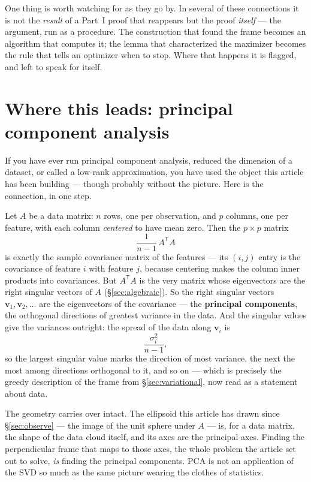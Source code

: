 \documentclass[11pt]{article}
\numberwithin{equation}{section}
\newcommand{\T}{^{\mathsf{T}}}
\newcommand{\vv}[1]{\mathbf{v}_{#1}}
\theoremstyle{plainish}
\begin{document}
One thing is worth watching for as they go by. In several of these connections it
is not the \emph{result} of a Part~I proof that reappears but the proof
\emph{itself} --- the argument, run as a procedure. The construction that found
the frame becomes an algorithm that computes it; the lemma that characterized the
maximizer becomes the rule that tells an optimizer when to stop. Where that
happens it is flagged, and left to speak for itself.

\section{Where this leads: principal component analysis}
\label{sec:pca}

If you have ever run principal component analysis, reduced the dimension of a
dataset, or called a low-rank approximation, you have used the object this
article has been building --- though probably without the picture. Here is the
connection, in one step.

Let $A$ be a data matrix: $n$ rows, one per observation, and $p$ columns, one
per feature, with each column \emph{centered} to have mean zero. Then the
$p \times p$ matrix
\begin{equation}\frac{1}{n-1}\,A\T A
\end{equation}
is exactly the sample covariance matrix of the features --- its $(i,j)$ entry is
the covariance of feature $i$ with feature $j$, because centering makes the
column inner products into covariances. But $A\T A$ is the very matrix whose
eigenvectors are the right singular vectors of $A$ (\S\ref{sec:algebraic}). So
the right singular vectors $\vv1, \vv2, \dots$ are the eigenvectors of the
covariance --- the \textbf{principal components}, the orthogonal directions of
greatest variance in the data. And the singular values give the variances
outright: the spread of the data along $\vv i$ is
\begin{equation}\frac{\sigma_i^2}{n-1},
\end{equation}
so the largest singular value marks the direction of most variance, the next the
most among directions orthogonal to it, and so on --- which is precisely the
greedy description of the frame from \S\ref{sec:variational}, now read as a
statement about data.

The geometry carries over intact. The ellipsoid this article has drawn since
\S\ref{sec:observe} --- the image of the unit sphere under $A$ --- is, for a data
matrix, the shape of the data cloud itself, and its axes are the principal axes.
Finding the perpendicular frame that maps to those axes, the whole problem the
article set out to solve, \emph{is} finding the principal components. PCA is not
an application of the SVD so much as the same picture wearing the clothes of
statistics.
\end{document}
